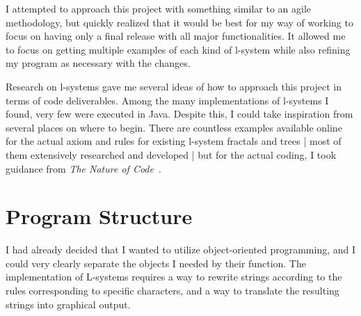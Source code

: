 \documentclass[]{final_report}
\begin{document}
I attempted to approach this project with something similar to an agile methodology, but quickly realized that it would be best for my way of working to focus on having only a final release with all major functionalities. It allowed me to focus on getting multiple examples of each kind of l-system while also refining my program as necessary with the changes.

Research on l-systems gave me several ideas of how to approach this project in terms of code deliverables. Among the many implementations of l-systems I found, very few were executed in Java. Despite this, I could take inspiration from several places on where to begin. There are countless examples available online for the actual axiom and rules for existing l-system fractals and trees | most of them extensively researched and developed | but for the actual coding, I took guidance from \emph{The Nature of Code}~\cite{NOC:2024}.

\section{Program Structure}

I had already decided that I wanted to utilize object-oriented programming, and I could very clearly separate the objects I needed by their function. The implementation of L-systems requires a way to rewrite strings according to the rules corresponding to specific characters, and a way to translate the resulting strings into graphical output. 
\end{document}
